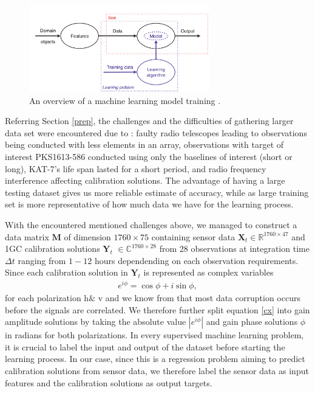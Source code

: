 \begin{figure}[H]
  \centering
    \includegraphics[width=0.7\textwidth]{images/MLSampler.png}
    \caption{An overview of a machine learning model training \citep{flach2012machine}.}
  \label{overview}
\end{figure}

Referring Section \ref{prep}, the challenges and the difficulties of gathering  larger data set were encountered  due to : faulty radio telescopes leading to observations being conducted with less elements in an array, observations with target of interest PKS1613-586 conducted using only the baselines of interest (short or long), KAT-7's life span lasted for a short period, and radio frequency interference affecting calibration solutions. The advantage of having a large testing dataset gives us more reliable estimate of accuracy, while as large training set is more representative of how much data we have for the learning process. 

With the encountered mentioned challenges above, we managed to construct a data matrix $\textbf{M}$ of dimension  $1760\times 75$ containing sensor data $\textbf{X}_t\in \mathbb{R}^{1760 \times 47}$ and 1GC calibration solutions $\textbf{Y}_t$ $\in \mathbb{C}^{1760 \times 28}$ from 28 observations at integration time $\Delta t$ ranging from $1-12$ hours dependending on each observation requirements. Since each calibration solution in $\textbf{Y}_t$ is represented as complex variables \begin{align}
e^{i\phi}= \cos\phi + i\sin\phi, \label{cx}
\end{align} for each polarization h$\&$ v and we know from \citep{taylor1999synthesis} that most data corruption occurs before the signals are correlated. We therefore further split equation \ref{cx} into gain amplitude solutions by taking the absolute value  $\left|e^{i\phi}\right|$ and gain phase solutions $\phi$ in radians for both polarizations. In every supervised machine learning problem, it is crucial to label the input and output of the dataset before starting the learning process. In our case, since this is a regression problem aiming to predict calibration solutions from sensor data, we therefore label the sensor data as input features and the calibration solutions as output targets.
    
